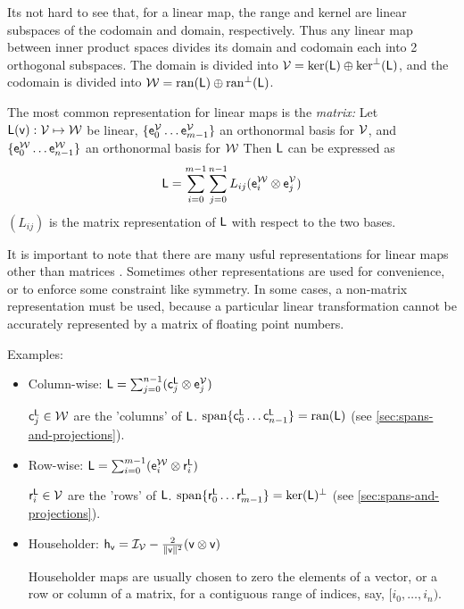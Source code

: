 Its not hard to see that, for a linear map,
the range and kernel are linear subspaces of the codomain and
domain, respectively.
Thus any linear map between inner product spaces
divides its domain and codomain each into 2 orthogonal subspaces.
The domain is divided into $\mathcal{V} = \mathrm{ker}(\mathsf{L}) \oplus \mathrm{ker}^{\perp}(\mathsf{L})$,
and the codomain is divided into $\mathcal{W} = \mathrm{ran}(\mathsf{L}) \oplus \mathrm{ran}^{\perp}(\mathsf{L})$.

The most common representation for linear maps is the {\it matrix:}
Let $\mathsf{L}(\mathsf{v}):\mathcal{V} \mapsto \mathcal{W}$ be linear,
$\{ \mathsf{e}_0^{\mathcal{V}} \ldots  \mathsf{e}_{m-1}^{\mathcal{V}} \}$ an orthonormal basis for $\mathcal{V}$,
and
$\{ \mathsf{e}_0^{\mathcal{W}} \ldots \mathsf{e}_{n-1}^{\mathcal{W}} \}$ an orthonormal  basis for $\mathcal{W}$
Then $\mathsf{L}$ can be expressed as
\begin{equation}
\mathsf{L}
 =
\sum_{i=0}^{m-1} \sum_{j=0}^{n-1} L_{ij} ( \mathsf{e}_i^{\mathcal{W}} \otimes \mathsf{e}_j^{\mathcal{V}} )
\end{equation}
$(L_{ij})$ is the matrix representation of $\mathsf{L}$ with respect to
the two bases\cite{halmos1958finite}.

It is important to note that there are many usful
representations for linear maps other than matrices \cite{mcdonald-1989b}.
Sometimes other representations are used for convenience,
or to enforce some constraint like symmetry.
In some cases, a non-matrix representation must be used,
because a particular linear transformation
cannot be accurately represented by a matrix of floating point numbers.

Examples:

\begin{itemize}

\item Column-wise:
$\mathsf{L} = \sum_{j=0}^{n-1} ( \mathsf{c}_j^{\mathsf{L}} \otimes \mathsf{e}_j^{\mathcal{V}} )$

$\mathsf{c}_j^{\mathsf{L}} \in \mathcal{W}$ are the 'columns' of $\mathsf{L}$.
$\linear_span\{ \c_0^{\Lmap} \ldots \c_{n-1}^{\Lmap} \} = \range(\Lmap)$
(see \autoref{sec:spans-and-projections}).

\item Row-wise:
$\mathsf{L} = \sum_{i=0}^{m-1} ( \mathsf{e}_i^{\mathcal{W}} \otimes  \mathsf{r}_i^{\mathsf{L}} )$

$\mathsf{r}_i^{\mathsf{L}} \in \mathcal{V}$ are the 'rows' of $\mathsf{L}$.
$\linear_span\{ \r_0^{\Lmap} \ldots \r_{m-1}^{\Lmap} \} =  \kernel(\Lmap)^{\perp}$
(see \autoref{sec:spans-and-projections}).

\item Householder:
$\mathsf{h}_{\mathsf{v}} = \mathcal{I}_{\mathcal{V}} - \frac{2}{\| \mathsf{v} \|^2} (\mathsf{v} \otimes \mathsf{v})$

Householder maps are usually chosen to zero the elements of
a vector, or a row or column of a matrix, for a contiguous range of
indices, say, $[i_0,\ldots,i_n)$.

\end {itemize}


